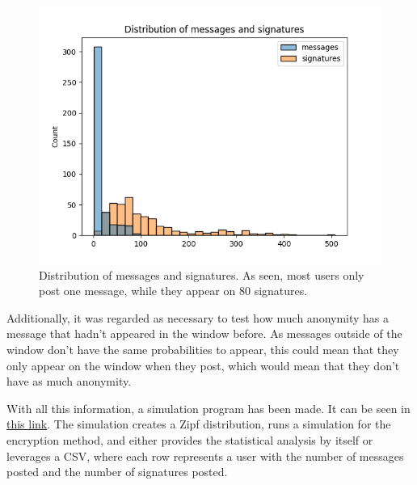 \documentclass[11pt,congress]{ieeetran}
\begin{document}
\begin{figure}[htbp]
\centering
\includegraphics[width=.9\linewidth]{sign-dist.png}
\caption{\label{fig:sign-dist}Distribution of messages and signatures. As seen, most users only post one message, while they appear on 80 signatures.}
\end{figure}

Additionally, it was regarded as necessary to test how much anonymity has a message that hadn't appeared in the window before. As messages outside of the window don't have the same probabilities to appear, this could mean that they only appear on the window when they post, which would mean that they don't have as much anonymity.

With all this information, a simulation program has been made. It can be seen in \href{https://github.com/sergisi/glowing-dollop}{this link}. The simulation creates a Zipf distribution, runs a simulation for the encryption method, and either provides the statistical analysis by itself or leverages a CSV, where each row represents a user with the number of messages posted and the number of signatures posted.
\end{document}
